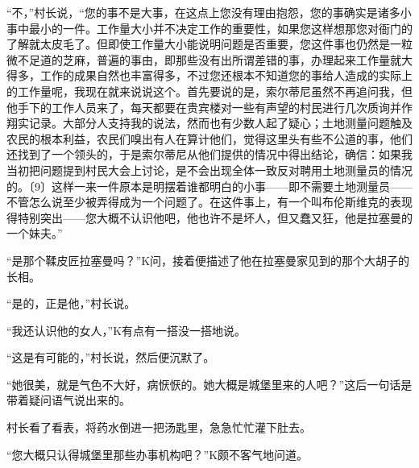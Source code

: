\documentclass[12pt,a4paper]{article}
\begin{document}
“不，”村长说，“您的事不是大事，在这点上您没有理由抱怨，您的事确实是诸多小事中最小的一件。工作量大小并不决定工作的重要性，如果您这样想那您对衙门的了解就太皮毛了。但即使工作量大小能说明问题是否重要，您这件事也仍然是一粒微不足道的芝麻，普遍的事由，即那些没有出所谓差错的事，办理起来工作量就大得多，工作的成果自然也丰富得多，不过您还根本不知道您的事给人造成的实际上的工作量呢，我现在就来说说这个。首先要说的是，索尔蒂尼虽然不再追问我，但他手下的工作人员来了，每天都要在贵宾楼对一些有声望的村民进行几次质询并作翔实记录。大部分人支持我的说法，然而也有少数人起了疑心；土地测量问题触及农民的根本利益，农民们嗅出有人在算计他们，觉得这里头有些不公道的事，他们还找到了一个领头的，于是索尔蒂尼从他们提供的情况中得出结论，确信：如果我当初把问题提到村民大会上讨论，是不会出现全体一致反对聘用土地测量员的情况的。〔9〕这样一来一件原本是明摆着谁都明白的小事——即不需要土地测量员——不管怎么说至少被弄得成为一个问题了。在这件事上，有一个叫布伦斯维克的表现得特别突出——您大概不认识他吧，他也许不是坏人，但又蠢又狂，他是拉塞曼的一个妹夫。”



“是那个鞣皮匠拉塞曼吗？”K问，接着便描述了他在拉塞曼家见到的那个大胡子的长相。



“是的，正是他，”村长说。



“我还认识他的女人，”K有点有一搭没一搭地说。



“这是有可能的，”村长说，然后便沉默了。



“她很美，就是气色不大好，病恹恹的。她大概是城堡里来的人吧？”这后一句话是带着疑问语气说出来的。



村长看了看表，将药水倒进一把汤匙里，急急忙忙灌下肚去。



“您大概只认得城堡里那些办事机构吧？”K颇不客气地问道。
\end{document}

